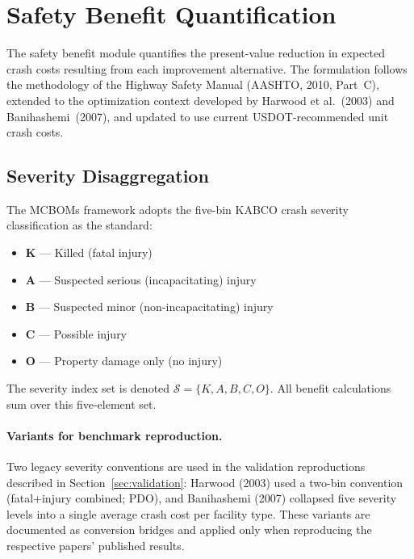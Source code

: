 \section{Safety Benefit Quantification}
\label{sec:safety}

The safety benefit module quantifies the present-value reduction in expected
crash costs resulting from each improvement alternative. The formulation
follows the methodology of the Highway Safety Manual (AASHTO, 2010, Part~C),
extended to the optimization context developed by Harwood et al.~(2003) and
Banihashemi~(2007), and updated to use current USDOT-recommended unit crash
costs.

\subsection{Severity Disaggregation}

The MCBOMs framework adopts the five-bin KABCO crash severity classification
as the standard:
\begin{itemize}[leftmargin=2em, itemsep=2pt]
  \item \textbf{K} --- Killed (fatal injury)
  \item \textbf{A} --- Suspected serious (incapacitating) injury
  \item \textbf{B} --- Suspected minor (non-incapacitating) injury
  \item \textbf{C} --- Possible injury
  \item \textbf{O} --- Property damage only (no injury)
\end{itemize}

The severity index set is denoted $\mathcal{S} = \{K, A, B, C, O\}$. All
benefit calculations sum over this five-element set.

\paragraph{Variants for benchmark reproduction.} Two legacy severity
conventions are used in the validation reproductions described in
Section~\ref{sec:validation}: Harwood (2003) used a two-bin convention
(fatal+injury combined; PDO), and Banihashemi (2007) collapsed five severity
levels into a single average crash cost per facility type. These variants are
documented as conversion bridges and applied only when reproducing the
respective papers' published results.

